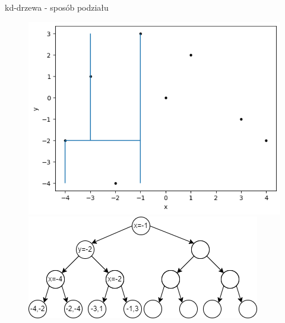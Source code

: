 \documentclass[aspectratio=169,dvipsnames]{beamer}
\begin{document}
\begin{frame}{kd-drzewa - sposób podziału}
    \begin{figure}[H]
        \centering
          \begin{minipage}{0.5\textwidth}
            \centering
            \includegraphics[width=\linewidth]{images/plots/5.png}
          \end{minipage}%
          \begin{minipage}{0.5\textwidth}
            \centering
            \includegraphics[width=\linewidth]{images/trees/7.drawio.png}
          \end{minipage}
    \end{figure}
\end{frame}
\end{document}
